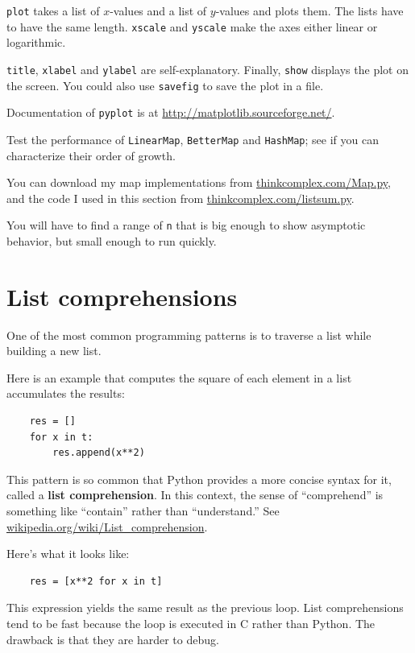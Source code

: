 \documentclass[10pt]{book}
\begin{document}
{\tt plot} takes a list of $x$-values and a list of $y$-values and
plots them.  The lists have to have the same length.
{\tt xscale} and {\tt yscale} make the axes either linear or logarithmic.

{\tt title}, {\tt xlabel} and {\tt ylabel} are self-explanatory.
Finally, {\tt show} displays the plot on the screen.  You could also
use {\tt savefig} to save the plot in a file.

Documentation of {\tt pyplot} is at \url{http://matplotlib.sourceforge.net/}.


\begin{ex}

Test the performance of
{\tt LinearMap}, {\tt BetterMap} and {\tt HashMap}; see if you
can characterize their order of growth.

You can download my map implementations from
\url{thinkcomplex.com/Map.py}, and the code I used in this section
from \url{thinkcomplex.com/listsum.py}.

You will have to find a range
of {\tt n} that is big enough to show asymptotic behavior, but small
enough to run quickly.

\end{ex}


\section{List comprehensions}

One of the most common programming patterns is to traverse
a list while building a new list.

Here is an example that computes the square of each element in
a list accumulates the results:

\begin{verbatim}
    res = []
    for x in t:
        res.append(x**2)
\end{verbatim}

This pattern is so common that Python provides a more
concise syntax for it, called a {\bf list comprehension}.
In this context, the sense of ``comprehend'' is something
  like ``contain'' rather than ``understand.''  See
  \url{wikipedia.org/wiki/List_comprehension}.

Here's what it looks like:

\begin{verbatim}
    res = [x**2 for x in t]
\end{verbatim}

This expression yields the same result as the previous loop.  List
comprehensions tend to be fast because the loop is executed in C
rather than Python.  The drawback is that they are harder to debug.
\end{document}
